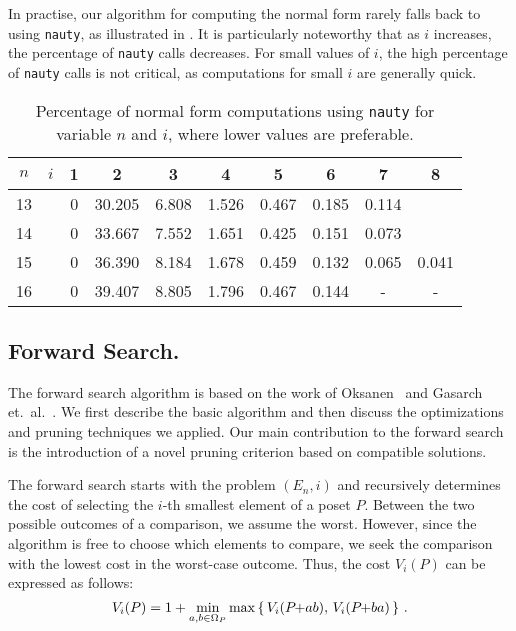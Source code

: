 \documentclass[a4paper,UKenglish,cleveref, autoref, thm-restate]{lipics-v2021}
\newcommand{\pchild}[3]{{#1}\kern-1pt{+}{#2}{#3}}
\begin{document}
In practise, our algorithm for computing the normal form rarely falls back to using \texttt{nauty}, as illustrated in .
It is particularly noteworthy that as $i$ increases, the percentage of \texttt{nauty} calls decreases.
For small values of $i$, the high percentage of \texttt{nauty} calls is not critical, as computations for small $i$ are generally quick.

\begin{table}[!t]
  \renewcommand{\arraystretch}{1.1}
  \caption{Percentage of normal form computations using \texttt{nauty} for variable $n$ and $i$, where lower values are preferable.}
  \label{table:nauty-ratio}
  \centering
  \small
  \begin{tabular}{cr|cccccccc}
    $n$ & $i$ & 1 & 2      & 3     & 4     & 5     & 6     & 7     & 8     \\ \hline
    13  &     & 0 & 30.205 & 6.808 & 1.526 & 0.467 & 0.185 & 0.114 &       \\
    14  &     & 0 & 33.667 & 7.552 & 1.651 & 0.425 & 0.151 & 0.073 &       \\
    15  &     & 0 & 36.390 & 8.184 & 1.678 & 0.459 & 0.132 & 0.065 & 0.041 \\
    16  &     & 0 & 39.407 & 8.805 & 1.796 & 0.467 & 0.144 & -     & -     \\
  \end{tabular}%
\end{table}

\subsection{Forward Search.} \label{chapter:forward_search}
The forward search algorithm is based on the work of Oksanen~\cite{Oksanen2006} and Gasarch et.\ al\@.~\cite{Gasarch1996}.
We first describe the basic algorithm and then discuss the optimizations and pruning techniques we applied.
Our main contribution to the forward search is the introduction of a novel pruning criterion based on compatible solutions.

The forward search starts with the problem $(E_n, i)$ and recursively determines the cost of selecting the $i$-th smallest element of a poset $P$.
Between the two possible outcomes of a comparison, we assume the worst.
However, since the algorithm is free to choose which elements to compare, we seek the comparison with the lowest cost in the worst-case outcome.
Thus, the cost $V_i(P)$ can be expressed as follows:
\begin{equation}
  V_i(P) = 1 + \min_{a,b \in \Omega_P} \max \left\{ \,V_i(\pchild{P}{a}{b}),\, V_i(\pchild{P}{b}{a})\,\right\}\,\text{.}
\end{equation}
\end{document}
